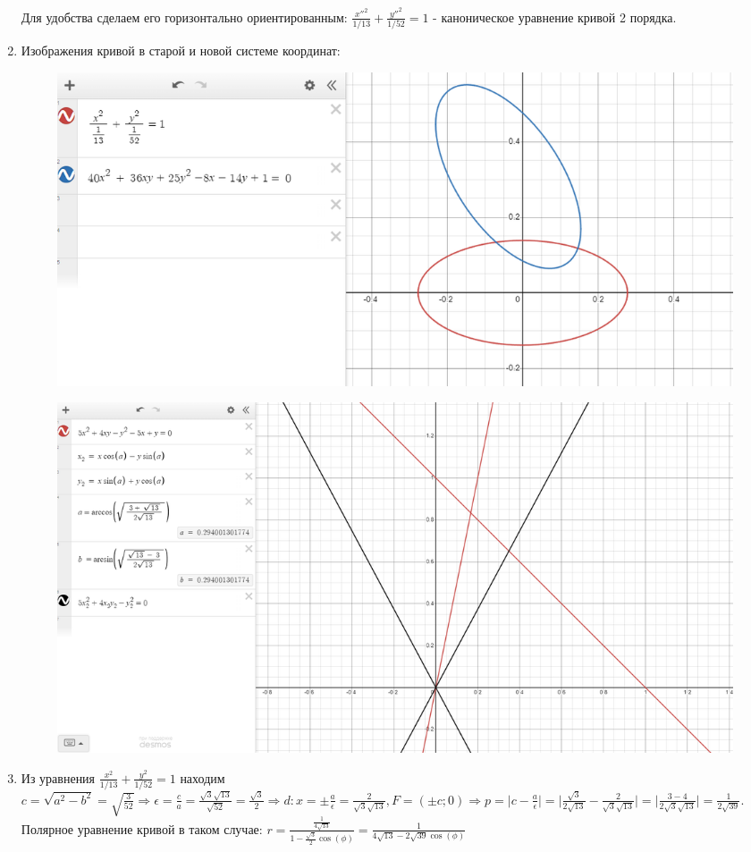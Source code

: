 \begin{enumerate}
    Для удобства сделаем его горизонтально ориентированным: $\frac{x''^2}{1/13} + \frac{y''^2}{1/52} = 1$ - каноническое уравнение кривой 2 порядка.
    \item Изображения кривой в старой и новой системе координат:
    \begin{figure}[H]
        \centering
        \includegraphics[width=1\linewidth]{images/2_b_1}
    \end{figure}
    \begin{figure}[H]
        \centering
        \includegraphics[width=1\linewidth]{images/2_b_2}
    \end{figure}

    \item Из уравнения $\frac{x^2}{1/13} + \frac{y^2}{1/52} = 1$ находим $c = \sqrt{a^2 - b^2} = \sqrt{\frac{3}{52}} \Rightarrow \epsilon = \frac{c}{a} = \frac{\sqrt{3}\sqrt{13}}{\sqrt{52}} = \frac{\sqrt{3}}{2} \Rightarrow d: x = \pm\frac{a}{\epsilon} = \frac{2}{\sqrt{3}\sqrt{13}}, F = (\pm c; 0) \Rightarrow p =  \mid c - \frac{a}{\epsilon} \mid  =  \mid \frac{\sqrt{3}}{2\sqrt{13}} - \frac{2}{\sqrt{3}\sqrt{13}} \mid  =  \mid \frac{3 - 4}{2\sqrt{3}\sqrt{13}} \mid  =  \frac{1}{2\sqrt{39}}$.\\

    Полярное уравнение кривой в таком случае: $r = \frac{\frac{1}{4\sqrt{13}}}{1 - \frac{\sqrt{3}}{2}\cos(\phi)} = \frac{1}{4\sqrt{13} - 2\sqrt{39}\cos(\phi)}$


\end{enumerate}
